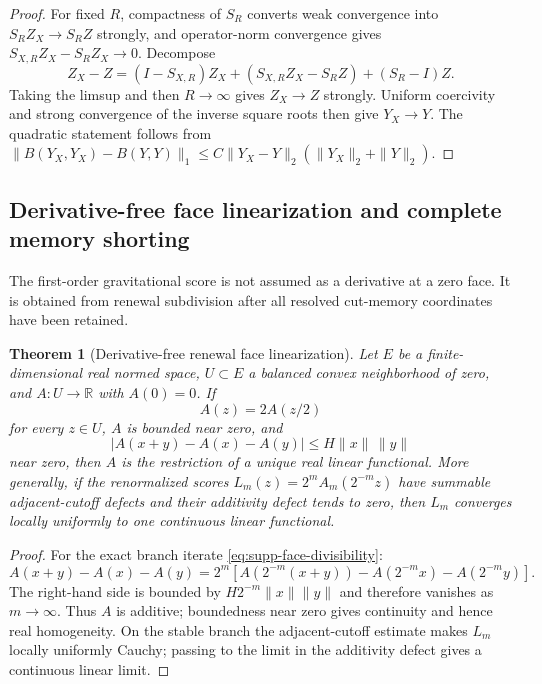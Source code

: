 \documentclass[11pt]{article}
\newtheorem{theorem}{Theorem}[section]
\theoremstyle{definition}
\theoremstyle{remark}
\newcommand{\R}{\mathbb R}
\begin{document}
\begin{proof}
For fixed $R$, compactness of $S_R$ converts weak convergence into
$S_RZ_X\to S_RZ$ strongly, and operator-norm convergence gives
$S_{X,R}Z_X-S_RZ_X\to0$.  Decompose
\[
 Z_X-Z=(I-S_{X,R})Z_X+(S_{X,R}Z_X-S_RZ)+(S_R-I)Z.
\]
Taking the limsup and then $R\to\infty$ gives $Z_X\to Z$ strongly.  Uniform
coercivity and strong convergence of the inverse square roots then give
$Y_X\to Y$.  The quadratic statement follows from
$\|B(Y_X,Y_X)-B(Y,Y)\|_1\le C\|Y_X-Y\|_2(\|Y_X\|_2+\|Y\|_2)$.
\end{proof}

\subsection{Derivative-free face linearization and complete memory shorting}

The first-order gravitational score is not assumed as a derivative at a zero
face.  It is obtained from renewal subdivision after all resolved cut-memory
coordinates have been retained.

\begin{theorem}[Derivative-free renewal face linearization]
\label{thm:supp-face-linearization}
Let $E$ be a finite-dimensional real normed space, $U\subset E$ a balanced
convex neighborhood of zero, and $A:U\to\R$ with $A(0)=0$.  If
\begin{equation}
 \boxed{A(z)=2A(z/2)}
 \label{eq:supp-face-divisibility}
\end{equation}
for every $z\in U$, $A$ is bounded near zero, and
\[
 |A(x+y)-A(x)-A(y)|\le H\|x\|\,\|y\|
\]
near zero, then $A$ is the restriction of a unique real linear functional.
More generally, if the renormalized scores
$L_m(z)=2^mA_m(2^{-m}z)$ have summable adjacent-cutoff defects and their
additivity defect tends to zero, then $L_m$ converges locally uniformly to one
continuous linear functional.
\end{theorem}

\begin{proof}
For the exact branch iterate \eqref{eq:supp-face-divisibility}:
\[
 A(x+y)-A(x)-A(y)
 =2^m[A(2^{-m}(x+y))-A(2^{-m}x)-A(2^{-m}y)].
\]
The right-hand side is bounded by $H2^{-m}\|x\|\|y\|$ and therefore vanishes as
$m\to\infty$.  Thus $A$ is additive; boundedness near zero gives continuity and
hence real homogeneity.  On the stable branch the adjacent-cutoff estimate makes
$L_m$ locally uniformly Cauchy; passing to the limit in the additivity defect
gives a continuous linear limit.
\end{proof}
\end{document}

